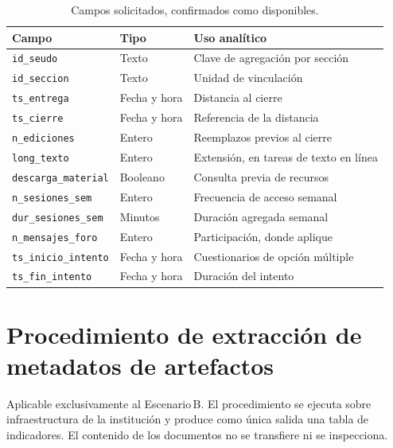 \documentclass[11pt,a4paper]{article}
\begin{document}
\begin{table}[htbp]
	\centering
	\small
	\caption{Campos solicitados, confirmados como disponibles.}
	\begin{tabularx}{\textwidth}{L{3.7cm} L{2.2cm} X}
		\toprule
		\textbf{Campo} & \textbf{Tipo} & \textbf{Uso analítico} \\
		\midrule
		\texttt{id\_seudo} & Texto & Clave de agregación por sección \\
		\texttt{id\_seccion} & Texto & Unidad de vinculación \\
		\texttt{ts\_entrega} & Fecha y hora & Distancia al cierre \\
		\texttt{ts\_cierre} & Fecha y hora & Referencia de la distancia \\
		\texttt{n\_ediciones} & Entero & Reemplazos previos al cierre \\
		\texttt{long\_texto} & Entero & Extensión, en tareas de texto en línea \\
		\texttt{descarga\_material} & Booleano & Consulta previa de recursos \\
		\texttt{n\_sesiones\_sem} & Entero & Frecuencia de acceso semanal \\
		\texttt{dur\_sesiones\_sem} & Minutos & Duración agregada semanal \\
		\texttt{n\_mensajes\_foro} & Entero & Participación, donde aplique \\
		\texttt{ts\_inicio\_intento} & Fecha y hora & Cuestionarios de opción múltiple \\
		\texttt{ts\_fin\_intento} & Fecha y hora & Duración del intento \\
		\bottomrule
	\end{tabularx}
\end{table}

\section{Procedimiento de extracción de metadatos de artefactos}
\label{anexo:extraccion}

Aplicable exclusivamente al Escenario\,B. El procedimiento se ejecuta sobre infraestructura de la institución y produce como única salida una tabla de indicadores. El contenido de los documentos no se transfiere ni se inspecciona.
\end{document}
